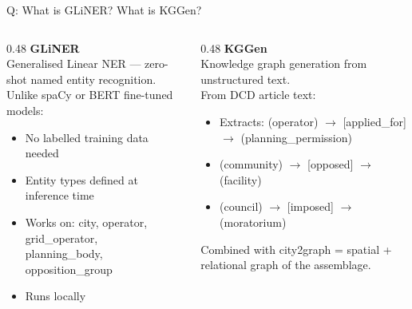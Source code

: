 \documentclass[aspectratio=169,11pt]{beamer}
\begin{document}
\begin{frame}[noframenumbering]{\enspace Q: What is GLiNER? What is KGGen?}
\begin{columns}[T]
\begin{column}{0.48\textwidth}
  \small\textbf{GLiNER}\\[0.3em]
  \footnotesize
  Generalised Linear NER — zero-shot named entity recognition.\\[0.3em]
  Unlike spaCy or BERT fine-tuned models:\\
  \begin{itemize}
    \item No labelled training data needed
    \item Entity types defined at inference time
    \item Works on: city, operator, grid\_operator,\\
          planning\_body, opposition\_group
    \item Runs locally
  \end{itemize}
\end{column}
\begin{column}{0.48\textwidth}
  \small\textbf{KGGen}\\[0.3em]
  \footnotesize
  Knowledge graph generation from unstructured text.\\[0.3em]
  From DCD article text:\\
  \begin{itemize}
    \item Extracts: (operator) $\to$ [applied\_for] $\to$ (planning\_permission)
    \item (community) $\to$ [opposed] $\to$ (facility)
    \item (council) $\to$ [imposed] $\to$ (moratorium)
  \end{itemize}
  Combined with city2graph = spatial + relational graph of the assemblage.
\end{column}
\end{columns}
\end{frame}
\end{document}
